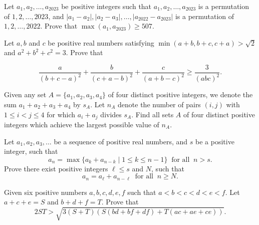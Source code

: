 \documentclass[11pt]{scrartcl}
\begin{document}
\begin{Problem}[IMO SL 2023 A5]
Let $a_1,a_2,\dots,a_{2023}$ be positive integers such that
$a_1,a_2,\dots,a_{2023}$ is a permutation of $1,2,\dots,2023$, and
$|a_1-a_2|,|a_2-a_3|,\dots,|a_{2022}-a_{2023}|$ is a permutation of $1,2,\dots,2022$.
Prove that $\max(a_1,a_{2023})\ge 507$.
\end{Problem}








\begin{Problem}
Let $a,b$ and $c$ be positive real numbers satisfying $\min(a+b,b+c,c+a) > \sqrt{2}$ and $a^2+b^2+c^2=3.$ Prove that

\[\frac{a}{(b+c-a)^2} + \frac{b}{(c+a-b)^2} + \frac{c}{(a+b-c)^2} \geq \frac{3}{(abc)^2}.\]
\end{Problem}

\begin{Problem}
Given any set $A = \{a_1, a_2, a_3, a_4\}$ of four distinct positive integers, we denote the sum $a_1 +a_2 +a_3 +a_4$ by $s_A$. Let $n_A$ denote the number of pairs $(i, j)$ with $1 \leq  i < j \leq 4$ for which $a_i +a_j$ divides $s_A$. Find all sets $A$ of four distinct positive integers which achieve the largest possible value of $n_A$.
\end{Problem}




\begin{Problem}
Let $a_1, a_2, a_3, \ldots$ be a sequence of positive real numbers, and $s$ be a positive integer, such that
\[a_n = \max \{ a_k + a_{n-k} \mid 1 \leq k \leq n-1 \} \ \textrm{ for all } \ n > s.\]
Prove there exist positive integers $\ell \leq s$ and $N$, such that
\[a_n = a_{\ell} + a_{n - \ell} \ \textrm{ for all } \ n \geq N.\]
\end{Problem}


\begin{Problem}
Given six positive numbers $a,b,c,d,e,f$ such that $a < b < c < d < e < f.$ Let $a+c+e=S$ and $b+d+f=T.$ Prove that
\[2ST > \sqrt{3(S+T)\left(S(bd + bf + df) + T(ac + ae + ce) \right)}.\]
\end{Problem}
\end{document}
